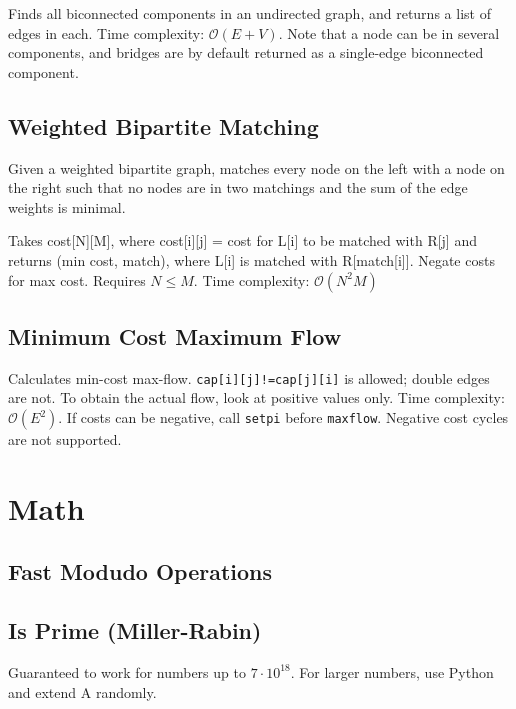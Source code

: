 \documentclass{article}
\begin{document}
Finds all biconnected components in an undirected graph, and returns a list of edges in each. Time complexity: $\mathcal{O}(E + V)$.
Note that a node can be in several components, and bridges are by default returned as a single-edge biconnected component.



\subsection*{Weighted Bipartite Matching}

Given a weighted bipartite graph, matches every node on the left with a node on the right such that no nodes
are in two matchings and the sum of the edge weights is minimal.

Takes cost[N][M], where cost[i][j] = cost for L[i] to be matched with R[j] and returns (min cost, match), where L[i] is matched with R[match[i]]. Negate costs for max cost. Requires $N \le M$.
Time complexity: $\mathcal{O}(N^2 M)$



\subsection*{Minimum Cost Maximum Flow}

Calculates min-cost max-flow. \lstinline{cap[i][j]!=cap[j][i]} is allowed; double edges are not. To obtain the actual flow, look at positive values only. Time complexity: $\mathcal{O}(E^2)$.
If costs can be negative, call \lstinline{setpi} before \lstinline{maxflow}. Negative cost cycles are not supported.



\vspace*{2cm}

\section*{Math}

\subsection*{Fast Modudo Operations}


\subsection*{Is Prime (Miller-Rabin)}
Guaranteed to work for numbers up to $7 \cdot 10^{18}$. For larger numbers, use Python and extend A randomly.
\begin{multicols}{2}
  
  \columnbreak
  
\end{multicols}
\end{document}

